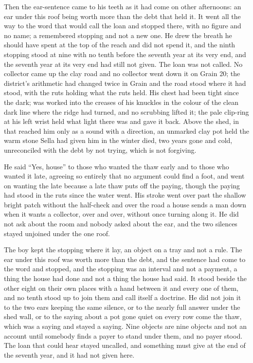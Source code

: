 Then the ear-sentence came to his teeth as it had come on other afternoons: an ear under this roof being worth more than the debt that held it. It went all the way to the word that would call the loan and stopped there, with no figure and no name; a remembered stopping and not a new one. He drew the breath he should have spent at the top of the reach and did not spend it, and the ninth stopping stood at nine with no tenth before the seventh year at its very end, and the seventh year at its very end had still not given. The loan was not called. No collector came up the clay road and no collector went down it on Grain 20; the district's arithmetic had changed twice in Grain and the road stood where it had stood, with the ruts holding what the ruts held. His chest had been tight since the dark;  was worked into the creases of his knuckles in the colour of the clean dark line where the ridge had turned, and no scrubbing lifted it; the pale clip-ring at his left wrist held what light there was and gave it back. Above the shed, in  that reached him only as a sound with a direction, an unmarked clay pot held the warm stone Sella had given him in the winter  died, two years gone and cold, unreconciled with the debt by not trying, which is not forgiving.

He said “Yes, house” to those who wanted the thaw early and to those who wanted it late, agreeing so entirely that no argument could find a foot, and went on wanting the late because a late thaw puts off the paying, though the paying had stood in the ruts since the water went. His stroke went over  past the shallow bright patch without the half-check and over the road a house sends a man down when it wants a collector, over and over, without once turning along it. He did not ask about the room and nobody asked about the ear, and the two silences stayed unjoined under the one roof.

The boy kept the stopping where it lay, an object on a tray and not a rule. The ear under this roof was worth more than the debt, and the sentence had come to the word and stopped, and the stopping was an interval and not a payment, a thing the house had done and not a thing the house had said. It stood beside the other eight on their own places with a hand between it and every one of them, and no tenth stood up to join them and call itself a doctrine. He did not join it to the two ears keeping the same silence, or to the nearly full answer under the shed wall, or to the saying about a pot gone quiet on every row come the thaw, which was a saying and stayed a saying. Nine objects are nine objects and not an account until somebody finds a payer to stand under them, and no payer stood. The loan that could hear stayed uncalled, and something must give at the end of the seventh year, and it had not given here.

